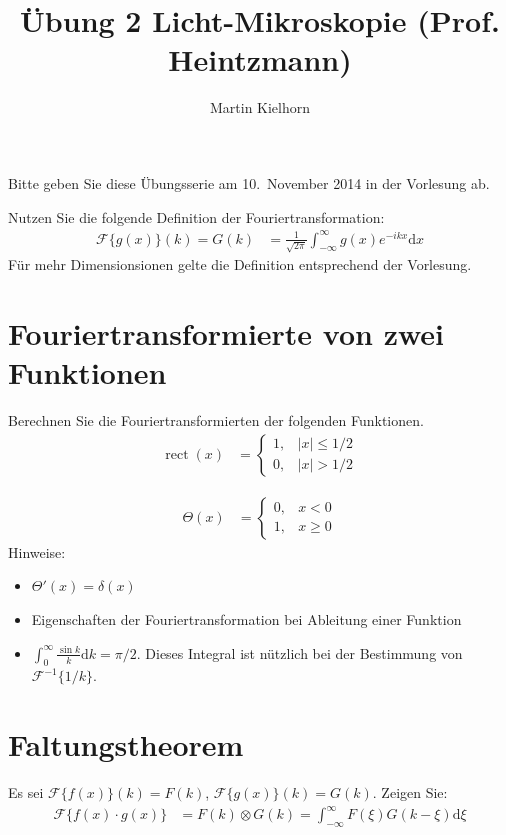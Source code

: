 \documentclass{article}
\DeclareMathOperator{\rect}{rect}
\begin{document}
\author{Martin Kielhorn}
\title{\"Ubung 2 Licht-Mikroskopie (Prof. Heintzmann)}
\maketitle

\noindent Bitte geben Sie diese \"Ubungsserie am 10.\ November 2014 in der Vorlesung ab.

\noindent Nutzen Sie die folgende Definition der Fouriertransformation:
\begin{align*}
  \mathcal{F}\{g(x)\}(k) = G(k) &= \frac{1}{\sqrt{2\pi}}\int_{-\infty}^\infty\!\!\! g(x) e^{-ikx} \textrm{d}x
\end{align*}
F\"ur mehr Dimensionsionen gelte die Definition entsprechend der Vorlesung.

\section{Fouriertransformierte von zwei Funktionen}
Berechnen Sie die Fouriertransformierten der folgenden Funktionen.
\begin{align}
  \rect(x) &=\begin{cases}
  1, & |x|\le 1/2 \\
  0, & |x| > 1/2
  \end{cases}
\end{align}

\begin{align}
  \Theta(x)&=\begin{cases}
  0, & x<0 \\
  1, & x \ge 0
  \end{cases}
\end{align}
Hinweise:
\begin{itemize}
  \item $\Theta'(x)=\delta(x)$
  \item  Eigenschaften der Fouriertransformation bei Ableitung einer Funktion
  \item $\int_0^\infty \frac{\sin k}{k}\textrm{d}k=\pi/2$. Dieses
    Integral ist n\"utzlich bei der Bestimmung von
    $\mathcal{F}^{-1}\{1/k\}$.
\end{itemize}

\section{Faltungstheorem}
Es sei $\mathcal{F}\{f(x)\}(k)=F(k)$, $\mathcal{F}\{g(x)\}(k)=G(k)$. Zeigen Sie:
\begin{align}
  \mathcal{F}\{f(x)\cdot g(x)\} &= F(k)\otimes G(k)=\int_{-\infty}^\infty\!\!\!\! F(\xi)G(k-\xi)
 \textrm{d}\xi
\end{align}
\end{document}

